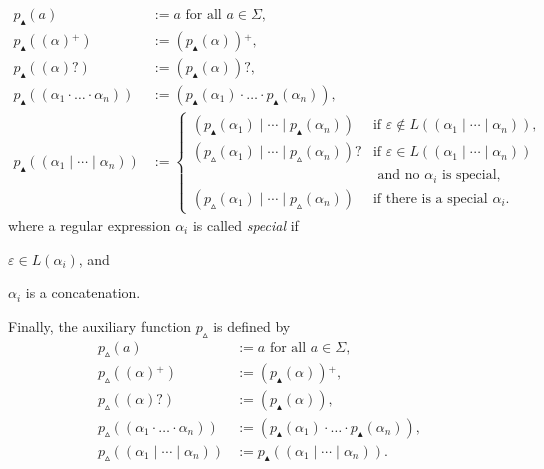 \documentclass[a4paper,11pt, svgnames,titlepage]{article}
\newcommand{\rxp}{{^\mathtt{+}}}
\newcommand{\rxo}{\mathtt{?}}
\newcommand{\rxc}{\cdot}
\DeclareMathOperator{\ror}{\mathtt{|}}
\newcommand{\emptyword}{\varepsilon}
\newcommand{\df}{:=}
\newcommand{\pnfupfun}{p_{\blacktriangle}}
\newcommand{\pnfuphfun}{p_{\vartriangle}}
\newcommand{\pnfup}[1]{\pnfupfun{\left(#1\right)}}
\newcommand{\pnfuph}[1]{\pnfuphfun{\left(#1\right)}}
\begin{document}
\begin{align*}
	\pnfup{a}&\df a \text{ for all $a\in \Sigma$},\\
	\pnfup{(\alpha)\rxp}
		&\df (\pnfup{\alpha})\rxp,\\
	\pnfup{(\alpha)\rxo}
		&\df (\pnfup{\alpha})\rxo,\\
	\pnfup{(\alpha_1\rxc \ldots \rxc \alpha_n)}
		&\df (\pnfup{\alpha_1}\rxc \ldots \rxc \pnfup{\alpha_n}),\\
	\pnfup{(\alpha_1\ror \cdots \ror \alpha_n)}
		&\df \begin{cases}
			(\pnfup{\alpha_1}\ror \cdots \ror \pnfup{\alpha_n}) & \text{if $\emptyword\notin L((\alpha_1\ror \cdots \ror \alpha_n))$},\\
			(\pnfuph{\alpha_1}\ror \cdots \ror \pnfuph{\alpha_n})\rxo & \text{if $\emptyword\in L((\alpha_1\ror \cdots \ror \alpha_n))$}\\
			& \text{ and no $\alpha_i$ is special},\\
			(\pnfuph{\alpha_1}\ror \cdots \ror \pnfuph{\alpha_n})& \text{if there is a special $\alpha_i$}.
		\end{cases}
\end{align*}
where a regular expression $\alpha_i$ is called \emph{special} if 
\begin{inparaenum}
\item $\emptyword\in L(\alpha_i)$, and
\item $\alpha_i$ is a concatenation.
\end{inparaenum}
Finally, the auxiliary function $\pnfuphfun$ is defined by
\begin{align*}
	\pnfuph{a}&\df a \text{ for all $a\in \Sigma$},\\
	\pnfuph{(\alpha)\rxp}
		&\df (\pnfup{\alpha})\rxp,\\
	\pnfuph{(\alpha)\rxo}
		&\df (\pnfup{\alpha}),\\
	\pnfuph{(\alpha_1\rxc \ldots \rxc \alpha_n)}
		&\df (\pnfup{\alpha_1}\rxc \ldots \rxc \pnfup{\alpha_n}),\\
	\pnfuph{(\alpha_1\ror \cdots \ror \alpha_n)}
		&\df \pnfup{(\alpha_1\ror \cdots \ror \alpha_n)}.
\end{align*}
\end{document}
